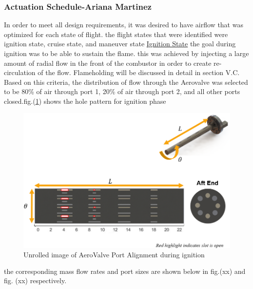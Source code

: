 \subsubsection{Actuation Schedule-Ariana Martinez}
In order to meet all design requirements, it was desired to have airflow that was optimized for each state of flight. the flight states that were identified were ignition state, cruise state, and maneuver state\newline
\newline
    \underline{ Ignition State}\newline
    the goal during ignition was to be able to sustain the flame. this was achieved by injecting a large amount of radial flow in the front of the combustor in order to create re-circulation  of the flow. Flameholding will be discussed in detail in section V.C. Based on this criteria, the distribution of flow through the Aerovalve was selected to be 80\% of air through port 1, 20\% of air through port 2, and all other ports closed.fig.(\ref{fig:unrolled ignition}) shows the hole pattern for ignition phase
\begin{figure}[H]
\centering
  \includegraphics[width=.8\linewidth]{AeroValve_Figures/unrolled_aerovalve_ignition.PNG}
  \caption{Unrolled image of AeroValve Port Alignment during ignition}
  \label{fig:unrolled ignition}
\end{figure}
the corresponding mass flow rates and port sizes are shown below in fig.(xx) and fig. (xx) respectively. 
